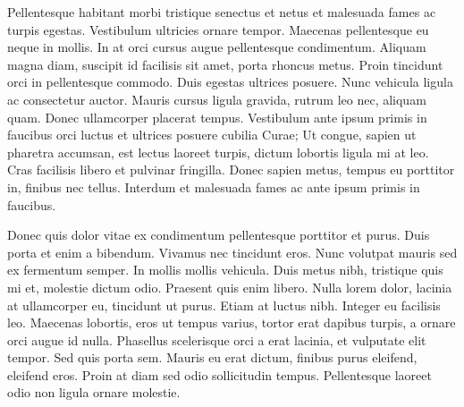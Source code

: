 \documentclass[11pt,fleqn]{book} %
\begin{document}
Pellentesque habitant morbi tristique senectus et netus et malesuada fames ac turpis egestas. Vestibulum ultricies ornare tempor. Maecenas pellentesque eu neque in mollis. In at orci cursus augue pellentesque condimentum. Aliquam magna diam, suscipit id facilisis sit amet, porta rhoncus metus. Proin tincidunt orci in pellentesque commodo. Duis egestas ultrices posuere. Nunc vehicula ligula ac consectetur auctor. Mauris cursus ligula gravida, rutrum leo nec, aliquam quam. Donec ullamcorper placerat tempus. Vestibulum ante ipsum primis in faucibus orci luctus et ultrices posuere cubilia Curae; Ut congue, sapien ut pharetra accumsan, est lectus laoreet turpis, dictum lobortis ligula mi at leo. Cras facilisis libero et pulvinar fringilla. Donec sapien metus, tempus eu porttitor in, finibus nec tellus. Interdum et malesuada fames ac ante ipsum primis in faucibus.

Donec quis dolor vitae ex condimentum pellentesque porttitor et purus. Duis porta et enim a bibendum. Vivamus nec tincidunt eros. Nunc volutpat mauris sed ex fermentum semper. In mollis mollis vehicula. Duis metus nibh, tristique quis mi et, molestie dictum odio. Praesent quis enim libero. Nulla lorem dolor, lacinia at ullamcorper eu, tincidunt ut purus. Etiam at luctus nibh. Integer eu facilisis leo. Maecenas lobortis, eros ut tempus varius, tortor erat dapibus turpis, a ornare orci augue id nulla. Phasellus scelerisque orci a erat lacinia, et vulputate elit tempor. Sed quis porta sem. Mauris eu erat dictum, finibus purus eleifend, eleifend eros. Proin at diam sed odio sollicitudin tempus. Pellentesque laoreet odio non ligula ornare molestie.
\newpage
    
    
    
    
\end{document}
